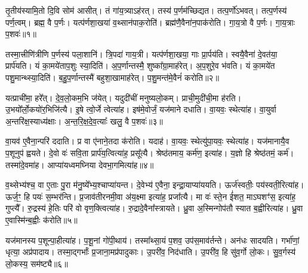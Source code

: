 \clearpage
{}
\setcounter{anuvakam}{0}

तृ॒तीय॑स्यामि॒तो दि॒वि सोम॑ आसीत्।
तं गा॑य॒त्र्या\-ऽह॑रत्।
तस्य॑ प॒र्णम॑च्छिद्यत।
तत्प॒र्णो॑\-ऽभवत्।
तत्प॒र्णस्य॑ पर्ण॒त्वम्।
ब्रह्म॒ वै प॒र्णः।
यत्प॑र्णशा॒खया॑ व॒थ्सान॑पाक॒रोति॑।
ब्रह्म॑णै॒वैना॑न॒पाक॑रोति।
गा॒य॒त्रो वै प॒र्णः।
गा॒य॒त्राः प॒शवः॑॥१॥

तस्मा॒त्त्रीणि॑त्रीणि प॒र्णस्य॑ पला॒शानि॑।
त्रि॒पदा॑ गाय॒त्री।
यत्प॑र्णशा॒खया॒ गाः प्रा॒र्पय॑ति।
स्वयै॒वैना॑ दे॒वत॑या॒ प्रार्प॑यति।
यं का॒मये॑ताप॒शुः स्या॒दिति॑।
अ॒प॒र्णान्तस्मै॒ शुष्का᳚ग्रा॒माह॑रेत्।
अ॒प॒शुरे॒व भ॑वति।
यं का॒मये॑त पशु॒मान्थ्स्या॒दिति॑।
ब॒हु॒प॒र्णान्तस्मै॑ बहुशा॒खामाह॑रेत्।
प॒शु॒मन्त॑मे॒वैनं॑ करोति॥२॥

यत्प्राची॑मा॒ हरे᳚त्।
दे॒व॒लो॒कम॒भि ज॑येत्।
यदुदी॑चीं मनुष्यलो॒कम्।
प्राची॒मुदी॑ची॒मा ह॑रति।
उ॒भयो᳚र्लो॒कयो॑र॒भि\-जि॑त्यै।
इ॒षे त्वो॒र्जे त्वेत्या॑ह।
इष॑मे॒वोर्जं॒ यज॑माने दधाति।
वा॒यवः॒ स्थेत्या॑ह।
वा॒युर्वा अ॒न्तरि॑क्ष॒स्याध्य॑क्षाः।
अ॒न्त॒रि॒क्ष॒दे॒व॒त्याः᳚ खलु॒ वै प॒शवः॑॥३॥

वा॒यव॑ ए॒वैना॒न्परि॑ ददाति।
प्र वा ए॑नाने॒तदा क॑रोति।
यदाह॑।
वा॒यवः॒ स्थेत्यु॑पा॒यवः॒ स्थेत्या॑ह।
यज॑मानायै॒व प॒शूनुप॑ ह्वयते।
दे॒वो वः॑ सवि॒ता प्रार्प॑य॒त्वित्या॑ह॒ प्रसू᳚त्यै।
श्रेष्ठ॑तमाय॒ कर्म॑ण॒ इत्या॑ह।
य॒ज्ञो हि श्रेष्ठ॑तमं॒ कर्म॑।
तस्मा॑दे॒वमा॑ह।
आप्या॑यध्वमघ्निया देवभा॒गमित्या॑ह॥४॥

व॒थ्सेभ्य॑श्च॒ वा ए॒ताः पु॒रा म॑नु॒ष्ये᳚भ्य॒श्चाप्या॑यन्त।
दे॒वेभ्य॑ ए॒वैना॒ इन्द्रा॒याप्या॑ययति।
ऊर्ज॑स्वतीः॒ पय॑स्वती॒रित्या॑ह।
ऊर्ज॒ꣳ॒ हि पयः॑ स॒म्भर॑न्ति।
प्र॒जाव॑तीरनमी॒वा अ॑य॒क्ष्मा इत्या॑ह॒ प्रजा᳚त्यै।
मा वः॑ स्ते॒न ई॑शत॒ माऽघशꣳ॑स॒ इत्या॑ह॒ गुप्त्यै᳚।
रु॒द्रस्य॑ हे॒तिः परि॑ वो वृण॒क्त्वित्या॑ह।
रु॒द्रादे॒वैना᳚स्त्रायते।
ध्रु॒वा अ॒स्मिन्गोप॑तौ स्यात ब॒ह्वीरित्या॑ह।
ध्रु॒वा ए॒वास्मि॑न्ब॒ह्वीः क॑रोति॥५॥

यज॑मानस्य प॒शून्पा॒हीत्या॑ह।
प॒शू॒नां गो॑पी॒थाय॑।
तस्मा᳚थ्सा॒यं प॒शव॒ उप॑स॒माव॑र्तन्ते।
अन॑धः सादयति।
गर्भा॑णां॒ धृत्या॒ अप्र॑पादाय।
तस्मा॒द्गर्भाः᳚ प्र॒जाना॒मप्र॑पादुकाः।
उ॒परी॑व॒ निद॑धाति।
उ॒परी॑व॒ हि सु॑व॒र्गो लो॒कः।
सु॒व॒र्गस्य॑ लो॒कस्य॒ सम॑ष्ट्यै॥६॥\anuvakamend[प॒शवः॑ करोति प॒शवो॑ देवभा॒गमित्या॑ह करोति॒ नव॑ च]

